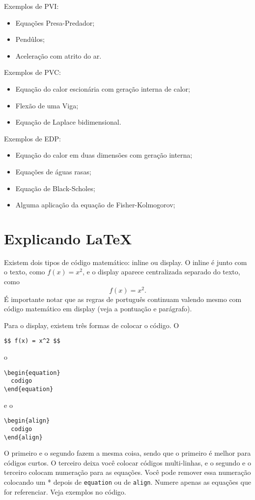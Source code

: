 \documentclass[a4paper,12pt]{article}
\begin{document}
Exemplos de PVI:
\begin{itemize}
  \item Equações Presa-Predador;
  \item Pendûlos;
\item Aceleração com atrito do ar.
\end{itemize}

Exemplos de PVC:
\begin{itemize}
  \item Equação do calor escionária com geração interna de calor;
  \item Flexão de uma Viga;
  \item Equação de Laplace bidimensional.
\end{itemize}

Exemplos de EDP:
\begin{itemize}
  \item Equação do calor em duas dimensões com geração interna;
  \item Equações de águas rasas;
  \item Equação de Black-Scholes;
  \item Alguma aplicação da equação de Fisher-Kolmogorov;
\end{itemize}

\section{Explicando LaTeX}

Existem dois tipos de código matemático: inline ou display.
O inline é junto com o texto, como $f(x) = x^2$, e o display aparece
centralizada separado do texto, como $$f(x) = x^2.$$
É importante notar que as regras de português continuam valendo mesmo com código
matemático em display (veja a pontuação e parágrafo).

Para o display, existem três formas de colocar o código. O
\begin{verbatim}
$$ f(x) = x^2 $$
\end{verbatim}
o
\begin{verbatim}
\begin{equation}
  codigo
\end{equation}
\end{verbatim}
e o
\begin{verbatim}
\begin{align}
  codigo
\end{align}
\end{verbatim}
O primeiro e o segundo fazem a mesma coisa, sendo que o primeiro é melhor para
códigos curtos. O terceiro deixa você colocar códigos multi-linhas, e o segundo
e o terceiro colocam numeração para as equações.
Você pode remover essa numeração colocando um * depois de \verb+equation+ ou
de \verb+align+.
Numere apenas as equações que for referenciar. Veja exemplos no código.
\end{document}
